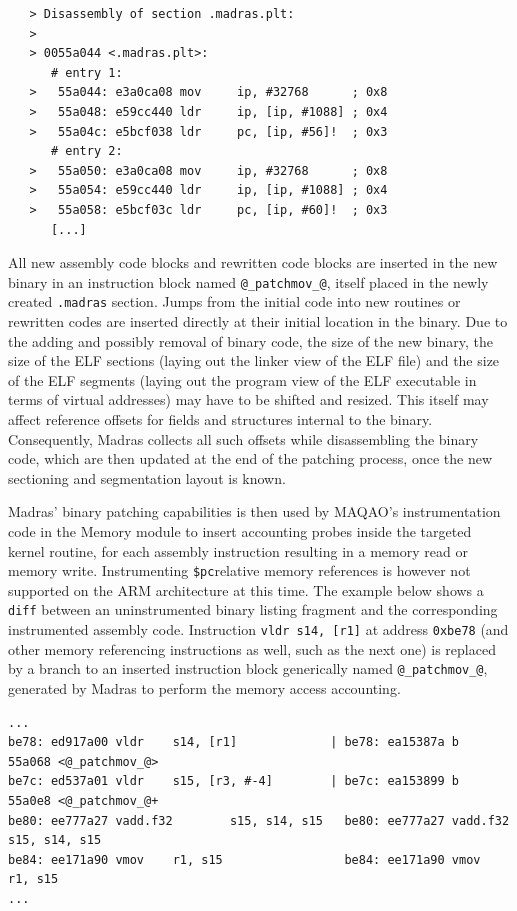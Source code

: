 \documentclass[11pt, a4paper, twoside]{montblanc2}
\begin{document}
\begin{footnotesize}
\begin{verbatim}
   > Disassembly of section .madras.plt:
   >
   > 0055a044 <.madras.plt>:
      # entry 1:
   >   55a044: e3a0ca08 mov     ip, #32768      ; 0x8
   >   55a048: e59cc440 ldr     ip, [ip, #1088] ; 0x4
   >   55a04c: e5bcf038 ldr     pc, [ip, #56]!  ; 0x3
      # entry 2:
   >   55a050: e3a0ca08 mov     ip, #32768      ; 0x8
   >   55a054: e59cc440 ldr     ip, [ip, #1088] ; 0x4
   >   55a058: e5bcf03c ldr     pc, [ip, #60]!  ; 0x3
      [...]
\end{verbatim}
\end{footnotesize}

All new assembly code blocks and rewritten code blocks are inserted in the new 
binary in an instruction block named \verb|@_patchmov_@|, itself placed in the 
newly created \verb|.madras| section. Jumps from the initial code into new 
routines or rewritten codes are inserted directly at their initial location in 
the binary. Due to the adding and possibly removal of binary code, the size of 
the new binary, the size of the ELF sections (laying out the linker view of the 
ELF file) and the size of the ELF segments (laying out the program view of the 
ELF executable in terms of virtual addresses) may have to be shifted and 
resized. This itself may affect reference offsets for fields and structures 
internal to the binary. Consequently, Madras collects all such offsets while 
disassembling the binary code, which are then updated at the end of the patching 
process, once the new sectioning and segmentation layout is known.

Madras' binary patching capabilities is then used by MAQAO's instrumentation 
code in the Memory module to insert accounting probes inside the targeted kernel 
routine, for each assembly instruction resulting in a memory read or memory 
write. Instrumenting \verb|$pc|relative memory references is however not 
supported on the ARM architecture at this time. The example below shows a \verb|diff| 
between an uninstrumented binary listing fragment and the corresponding 
instrumented assembly code. Instruction \verb|vldr s14, [r1]| at address 
\texttt{0xbe78} (and other memory referencing instructions as well, such as the 
next one) is replaced by a branch to an inserted instruction block generically 
named \verb|@_patchmov_@|, generated by Madras to perform the memory access 
accounting.
\begin{footnotesize}
\begin{verbatim}
...
be78: ed917a00 vldr    s14, [r1]             | be78: ea15387a b       55a068 <@_patchmov_@>
be7c: ed537a01 vldr    s15, [r3, #-4]        | be7c: ea153899 b       55a0e8 <@_patchmov_@+
be80: ee777a27 vadd.f32        s15, s14, s15   be80: ee777a27 vadd.f32        s15, s14, s15
be84: ee171a90 vmov    r1, s15                 be84: ee171a90 vmov    r1, s15
...
\end{verbatim}
\end{footnotesize}
\end{document}
